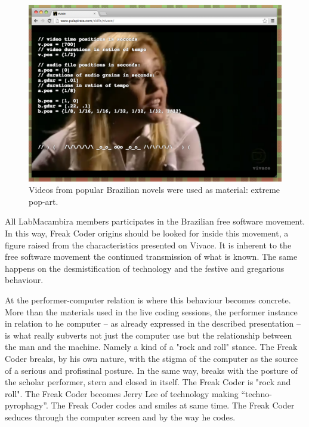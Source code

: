 \documentclass[letterpaper, 12pt]{article}
\begin{document}
\begin{figure}[htpb]
  \begin{center}
    \includegraphics[scale=.3]{img/fig_novela.png}
    \caption{Videos from popular Brazilian novels were used as
      material: extreme pop-art.}
    \label{fig:novela}
  \end{center}
\end{figure}


All LabMacambira members participates in the Brazilian free software movement. In this way, Freak Coder origins should be looked for inside this movement, a figure raised from the characteristics presented on Vivace. It is inherent to the free software movement the continued transmission of what is known. The same happens on the desmistification of technology and the festive and gregarious behaviour.

At the performer-computer relation is where this behaviour becomes concrete. More than the materials used in the live coding sessions, the performer instance in relation to he computer -- as already expressed in the described presentation -- is what really subverts not just the computer use but the relationship between the man and the machine. Namely a kind of a "rock and roll" stance. The Freak Coder breaks, by his own nature, with the stigma of the computer as the source of a serious and profissinal posture. In the same way, breaks with the posture of the scholar performer, stern and closed in itself. The Freak Coder is "rock and roll". The Freak Coder becomes Jerry Lee of technology making ``techno-pyrophagy''. The Freak Coder codes and smiles at same time. The Freak Coder seduces through the computer screen and by the way he codes.
\end{document}
